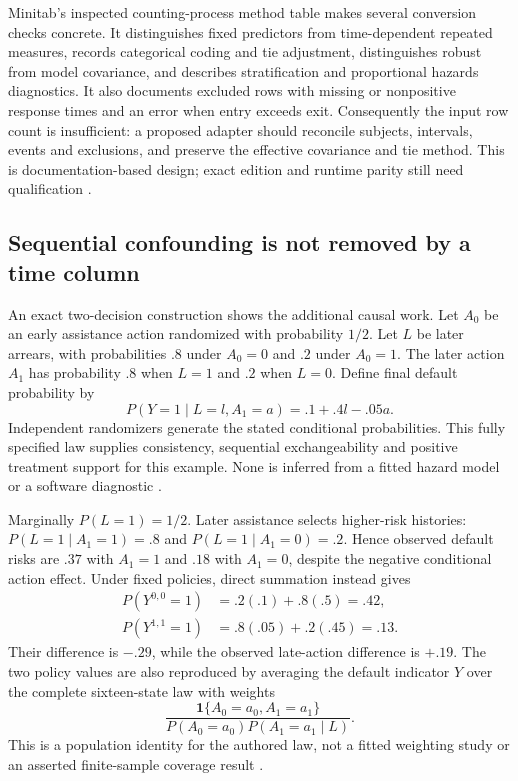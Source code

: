 Minitab's inspected counting-process method table makes several conversion
checks concrete. It distinguishes fixed predictors from time-dependent
repeated measures, records categorical coding and tie adjustment, distinguishes
robust from model covariance, and describes stratification and proportional hazards diagnostics. It also documents excluded rows with missing or
nonpositive response times and an error when entry exceeds exit. Consequently
the input row count is insufficient: a proposed adapter should reconcile
subjects, intervals, events and exclusions, and preserve the effective
covariance and tie method. This is documentation-based design; exact edition
and runtime parity still need qualification \citep{exec14_survival_minitab}.

\subsection{Sequential confounding is not removed by a time column}

An exact two-decision construction shows the additional causal work. Let
$A_0$ be an early assistance action randomized with probability $1/2$.
Let $L$ be later arrears, with probabilities $.8$ under $A_0=0$ and $.2$
under $A_0=1$. The later action $A_1$ has probability $.8$ when $L=1$ and
$.2$ when $L=0$. Define final default probability by
\[
 P(Y=1\mid L=l,A_1=a)=.1+.4l-.05a.
\]
Independent randomizers generate the stated conditional probabilities. This
fully specified law supplies consistency, sequential exchangeability and
positive treatment support for this example. None is inferred from a fitted
hazard model or a software diagnostic \citep{exec14_survival_exact}.

Marginally $P(L=1)=1/2$. Later assistance selects higher-risk histories:
$P(L=1\mid A_1=1)=.8$ and $P(L=1\mid A_1=0)=.2$. Hence observed default
risks are $.37$ with $A_1=1$ and $.18$ with $A_1=0$, despite the negative
conditional action effect. Under fixed policies, direct summation instead gives
\[
 \begin{split}
 P(Y^{0,0}=1)&=.2(.1)+.8(.5)=.42,\\
 P(Y^{1,1}=1)&=.8(.05)+.2(.45)=.13.
 \end{split}
\]
Their difference is $-.29$, while the observed late-action difference is
$+.19$. The two policy values are also reproduced by averaging the default indicator $Y$ over the complete
sixteen-state law with weights
\[
 \frac{\mathbf 1\{A_0=a_0,A_1=a_1\}}
 {P(A_0=a_0)P(A_1=a_1\mid L)}.
\]
This is a population identity for the authored law, not a fitted weighting
study or an asserted finite-sample coverage result
\citep{exec14_survival_exact}.

